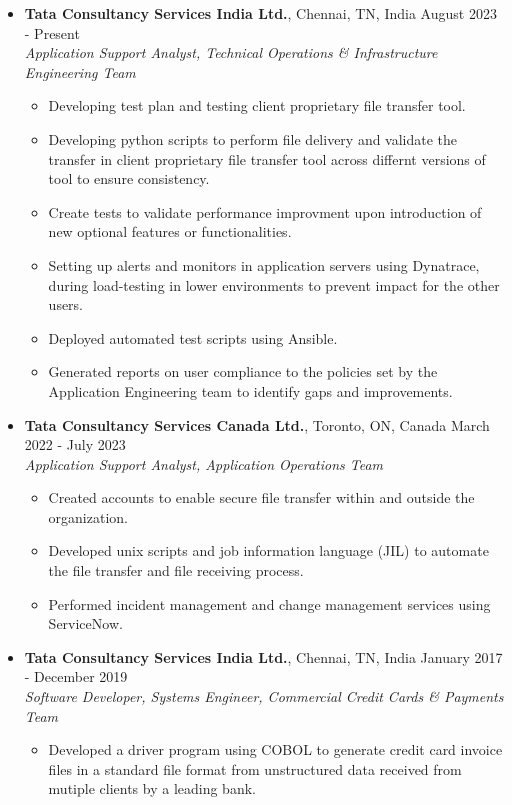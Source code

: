 \documentclass{article}
\begin{document}
	\begin{itemize}
		\item \textbf{Tata Consultancy Services India Ltd.}, Chennai, TN, India \hfill August 2023 - Present\\
		\textit{Application Support Analyst, Technical Operations \& Infrastructure Engineering Team}
		\begin{itemize}
			\item Developing test plan and testing client proprietary file transfer tool.
			\item Developing python scripts to perform file delivery and validate the transfer in client proprietary file transfer tool across differnt versions of tool to ensure consistency.
			\item Create tests to validate performance improvment upon introduction of new optional features or functionalities.
			\item Setting up alerts and monitors in application servers using Dynatrace, during load-testing in lower environments to prevent impact for the other users.
			\item Deployed automated test scripts using Ansible.
			\item Generated reports on user compliance to the policies set by the Application Engineering team to identify gaps and improvements.
		\end{itemize}
		\item \textbf{Tata Consultancy Services Canada Ltd.}, Toronto, ON, Canada \hfill March 2022 - July 2023\\
		\textit{Application Support Analyst, Application Operations Team}
		\begin{itemize}
			\item Created accounts to enable secure file transfer within and outside the organization.
			\item Developed unix scripts and job information language (JIL) to automate the file transfer and file receiving process.
			\item Performed incident management and change management services using ServiceNow.
		\end{itemize}
		\item \textbf{Tata Consultancy Services India Ltd.}, Chennai, TN, India \hfill January 2017 - December 2019\\
		\textit{Software Developer, Systems Engineer, Commercial Credit Cards \& Payments Team}
		\begin{itemize}
        		\item Developed a driver program using COBOL to generate credit card invoice files in a standard file format from unstructured data received from mutiple clients by a leading bank. 

\end{itemize}
\end{itemize}
\end{document}
